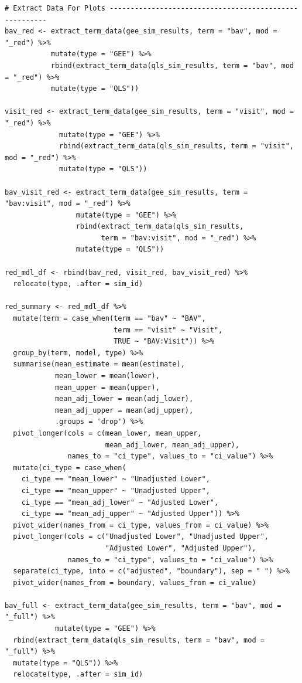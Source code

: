 \documentclass[
]{aft}
\begin{document}
\begin{verbatim}
# Extract Data For Plots -------------------------------------------------------
bav_red <- extract_term_data(gee_sim_results, term = "bav", mod = "_red") %>% 
           mutate(type = "GEE") %>%
           rbind(extract_term_data(qls_sim_results, term = "bav", mod = "_red") %>%
           mutate(type = "QLS")) 

visit_red <- extract_term_data(gee_sim_results, term = "visit", mod = "_red") %>% 
             mutate(type = "GEE") %>%
             rbind(extract_term_data(qls_sim_results, term = "visit", mod = "_red") %>%
             mutate(type = "QLS")) 

bav_visit_red <- extract_term_data(gee_sim_results, term = "bav:visit", mod = "_red") %>%
                 mutate(type = "GEE") %>%
                 rbind(extract_term_data(qls_sim_results, 
                       term = "bav:visit", mod = "_red") %>% 
                 mutate(type = "QLS")) 

red_mdl_df <- rbind(bav_red, visit_red, bav_visit_red) %>% 
  relocate(type, .after = sim_id)

red_summary <- red_mdl_df %>%
  mutate(term = case_when(term == "bav" ~ "BAV",
                          term == "visit" ~ "Visit",
                          TRUE ~ "BAV:Visit")) %>%
  group_by(term, model, type) %>%
  summarise(mean_estimate = mean(estimate),
            mean_lower = mean(lower),
            mean_upper = mean(upper),
            mean_adj_lower = mean(adj_lower),
            mean_adj_upper = mean(adj_upper),
            .groups = 'drop') %>%
  pivot_longer(cols = c(mean_lower, mean_upper, 
                        mean_adj_lower, mean_adj_upper),
               names_to = "ci_type", values_to = "ci_value") %>%
  mutate(ci_type = case_when(
    ci_type == "mean_lower" ~ "Unadjusted Lower",
    ci_type == "mean_upper" ~ "Unadjusted Upper",
    ci_type == "mean_adj_lower" ~ "Adjusted Lower",
    ci_type == "mean_adj_upper" ~ "Adjusted Upper")) %>%
  pivot_wider(names_from = ci_type, values_from = ci_value) %>%
  pivot_longer(cols = c("Unadjusted Lower", "Unadjusted Upper", 
                        "Adjusted Lower", "Adjusted Upper"),
               names_to = "ci_type", values_to = "ci_value") %>%
  separate(ci_type, into = c("adjusted", "boundary"), sep = " ") %>%
  pivot_wider(names_from = boundary, values_from = ci_value)

bav_full <- extract_term_data(gee_sim_results, term = "bav", mod = "_full") %>% 
            mutate(type = "GEE") %>%
  rbind(extract_term_data(qls_sim_results, term = "bav", mod = "_full") %>% 
  mutate(type = "QLS")) %>%
  relocate(type, .after = sim_id)


\end{verbatim}
\end{document}
